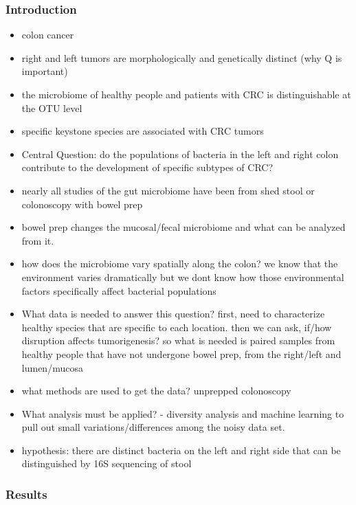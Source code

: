 \documentclass[11pt,]{article}
\begin{document}
\subsubsection{Introduction}\label{introduction}

\begin{itemize}
\item
  colon cancer
\item
  right and left tumors are morphologically and genetically distinct
  (why Q is important)
\item
  the microbiome of healthy people and patients with CRC is
  distinguishable at the OTU level
\item
  specific keystone species are associated with CRC tumors
\item
  Central Question: do the populations of bacteria in the left and right
  colon contribute to the development of specific subtypes of CRC?
\item
  nearly all studies of the gut microbiome have been from shed stool or
  colonoscopy with bowel prep
\item
  bowel prep changes the mucosal/fecal microbiome and what can be
  analyzed from it.
\item
  how does the microbiome vary spatially along the colon? we know that
  the environment varies dramatically but we dont know how those
  environmental factors specifically affect bacterial populations
\item
  What data is needed to answer this question? first, need to
  characterize healthy species that are specific to each location. then
  we can ask, if/how disruption affects tumorigenesis? so what is needed
  is paired samples from healthy people that have not undergone bowel
  prep, from the right/left and lumen/mucosa
\item
  what methods are used to get the data? unprepped colonoscopy
\item
  What analysis must be applied? - diversity analysis and machine
  learning to pull out small variations/differences among the noisy data
  set.
\item
  hypothesis: there are distinct bacteria on the left and right side
  that can be distinguished by 16S sequencing of stool
\end{itemize}

\subsubsection{Results}\label{results}
\end{document}

